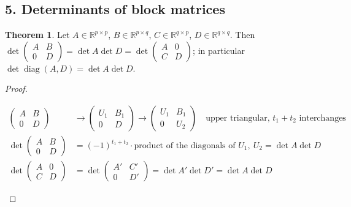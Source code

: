 \documentclass[12pt]{article}
\newcommand{\R}{\mathbb R}
\newcommand{\C}{\mathbb C}
\DeclareMathOperator{\diag}{diag}
\theoremstyle{definition}
\newtheorem{theorem}{Theorem}
\newcommand{\boardtop}{\vspace*{-\abovedisplayskip}}
\begin{document}
\subsection*{5. Determinants of block matrices}

\begin{theorem}\label{b5.29}
Let \(A\in\R^{p\times p}\), \(B\in\R^{p\times q}\), \(C\in\R^{q\times p}\), \(D\in\R^{q\times q}\). Then
\(\det\left(\begin{smallmatrix}A&B\\0&D\end{smallmatrix}\right)=\det A\det D
=\det\left(\begin{smallmatrix}A&0\\C&D\end{smallmatrix}\right)\); in particular \(\det\diag(A,D)=\det A\det D\).
\end{theorem}
\begin{proof}
\begin{board}[Interchanges and additions take \(A\) to an upper triangular \(U_1\) (\(t_1\) interchanges), \(D\) to an
upper triangular \(U_2\) (\(t_2\) interchanges); apply them to rows \(1,\dots,p\) and to rows \(p+1,\dots,p+q\) of the block
matrix (Theorem~\ref{b5.15}: \(\det A=(-1)^{t_1}\cdot\) product of the diagonal of \(U_1\)); the transpose
(Theorem~\ref{b5.3}(b), Theorem~\ref{b5.21}(b)):]
\boardtop
\begin{align*}
\begin{pmatrix}A&B\\0&D\end{pmatrix}&\longrightarrow\begin{pmatrix}U_1&B_1\\0&D\end{pmatrix}\longrightarrow
\begin{pmatrix}U_1&B_1\\0&U_2\end{pmatrix}\quad\text{upper triangular, \(t_1+t_2\) interchanges}\\
\det\begin{pmatrix}A&B\\0&D\end{pmatrix}&=(-1)^{t_1+t_2}\cdot\text{product of the diagonals of }U_1,\ U_2=\det A\det D\\
\det\begin{pmatrix}A&0\\C&D\end{pmatrix}&=\det\begin{pmatrix}A'&C'\\0&D'\end{pmatrix}=\det A'\det D'=\det A\det D
\end{align*}
\end{board}
\nopagebreak
\end{proof}
\end{document}
